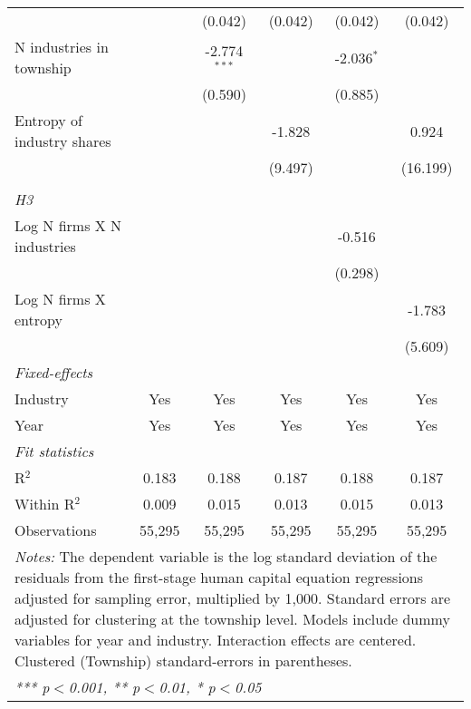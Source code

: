 \begin{tabular}{lccccc}
                                             &                 & (0.042)         & (0.042)         & (0.042)         & (0.042)\\   
   N industries in township                  &                 & -2.774$^{***}$  &                 & -2.036$^{*}$    &   \\   
                                             &                 & (0.590)         &                 & (0.885)         &   \\   
   Entropy of industry shares                &                 &                 & -1.828          &                 & 0.924\\   
                                             &                 &                 & (9.497)         &                 & (16.199)\\   
\hdashline %
\\[0.1ex] %
\emph{H3} \\ 
   Log N firms X N industries                &                 &                 &                 & -0.516          &   \\   
                                             &                 &                 &                 & (0.298)         &   \\   
   Log N firms X entropy                     &                 &                 &                 &                 & -1.783\\   
                                             &                 &                 &                 &                 & (5.609)\\   
   \midrule
   \emph{Fixed-effects}\\
   Industry                                  & Yes             & Yes             & Yes             & Yes             & Yes\\  
   Year                                      & Yes             & Yes             & Yes             & Yes             & Yes\\  
   \midrule
   \emph{Fit statistics}\\
   R$^2$                                     & 0.183           & 0.188           & 0.187           & 0.188           & 0.187\\  
   Within R$^2$                              & 0.009           & 0.015           & 0.013           & 0.015           & 0.013\\  
   Observations                              & 55,295          & 55,295          & 55,295          & 55,295          & 55,295\\  
   \midrule \midrule
\multicolumn{6}{p{16cm}}{\emph{Notes:} The dependent variable is the log 
    standard deviation of the residuals from the first-stage human capital equation 
    regressions adjusted for sampling error, multiplied by 1,000. Standard errors 
    are adjusted for clustering at the township level. Models include dummy variables 
    for year and industry. Interaction effects are centered. Clustered (Township) 
    standard-errors in parentheses.}\\
\multicolumn{6}{l}{\emph{*** p$<$0.001, ** p$<$0.01, * p$<$0.05}} \\ 
\end{tabular}
\par\endgroup
